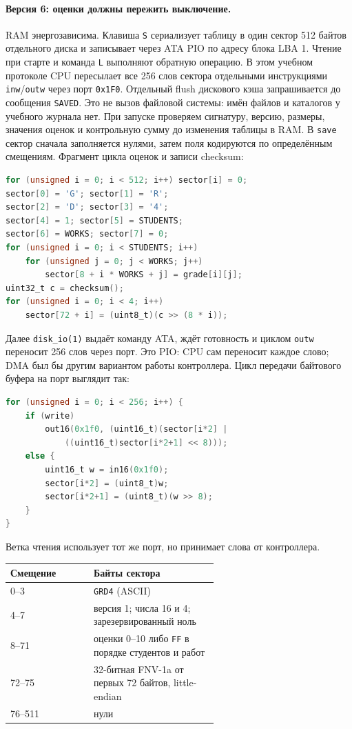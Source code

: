 \paragraph{Версия 6: оценки должны пережить выключение.}
RAM энергозависима. Клавиша \texttt{S} сериализует таблицу в один сектор
512 байтов отдельного диска и записывает через ATA PIO по адресу блока
LBA 1. Чтение при старте и команда \texttt{L} выполняют обратную операцию.
В этом учебном протоколе CPU пересылает все 256 слов сектора отдельными
инструкциями \texttt{inw}/\texttt{outw} через порт \texttt{0x1F0}.
Отдельный flush дискового кэша запрашивается до сообщения \texttt{SAVED}.
Это не вызов файловой системы: имён файлов и каталогов у учебного журнала
нет. При запуске проверяем сигнатуру, версию, размеры, значения оценок и
контрольную сумму до изменения таблицы в RAM.
В \texttt{save} сектор сначала заполняется нулями, затем поля кодируются
по определённым смещениям. Фрагмент цикла оценок и записи checksum:
\begin{lstlisting}[language=C,basicstyle=\ttfamily\small]
for (unsigned i = 0; i < 512; i++) sector[i] = 0;
sector[0] = 'G'; sector[1] = 'R';
sector[2] = 'D'; sector[3] = '4';
sector[4] = 1; sector[5] = STUDENTS;
sector[6] = WORKS; sector[7] = 0;
for (unsigned i = 0; i < STUDENTS; i++)
    for (unsigned j = 0; j < WORKS; j++)
        sector[8 + i * WORKS + j] = grade[i][j];
uint32_t c = checksum();
for (unsigned i = 0; i < 4; i++)
    sector[72 + i] = (uint8_t)(c >> (8 * i));
\end{lstlisting}
Далее \texttt{disk\_io(1)} выдаёт команду ATA, ждёт готовность и циклом
\texttt{outw} переносит 256 слов через порт. Это PIO: CPU сам переносит
каждое слово; DMA был бы другим вариантом работы контроллера.
Цикл передачи байтового буфера на порт выглядит так:
\begin{lstlisting}[language=C,basicstyle=\ttfamily\small]
for (unsigned i = 0; i < 256; i++) {
    if (write)
        out16(0x1f0, (uint16_t)(sector[i*2] |
            ((uint16_t)sector[i*2+1] << 8)));
    else {
        uint16_t w = in16(0x1f0);
        sector[i*2] = (uint8_t)w;
        sector[i*2+1] = (uint8_t)(w >> 8);
    }
}
\end{lstlisting}
Ветка чтения использует тот же порт, но принимает слова от контроллера.

\begin{center}
\small
\begin{tabular}{|l|p{0.6\linewidth}|}
\hline
Смещение & Байты сектора \\
\hline
0--3 & \texttt{GRD4} (ASCII) \\
4--7 & версия 1; числа 16 и 4; зарезервированный ноль \\
8--71 & оценки 0--10 либо \texttt{FF} в порядке студентов и работ \\
72--75 & 32-битная FNV-1a от первых 72 байтов, little-endian \\
76--511 & нули \\
\hline
\end{tabular}
\end{center}

